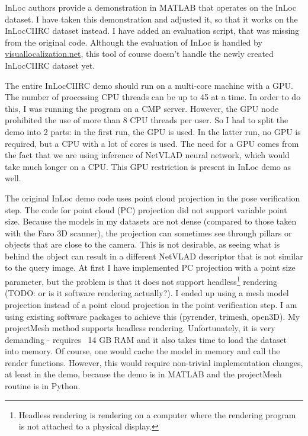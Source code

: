 \documentclass[twoside]{ctuthesis}
\theoremstyle{plain}
\theoremstyle{definition}
\theoremstyle{note}
\begin{document}
InLoc \cite{taira2018inloc} authors provide a demonstration in MATLAB that operates on the InLoc dataset. I have taken this demonstration and adjusted it, so that it works on the InLocCIIRC dataset instead. I have added an evaluation script, that was missing from the original code. Although the evaluation of InLoc is handled by \url{visuallocalization.net}, this tool of course doesn't handle the newly created InLocCIIRC dataset yet.

The entire InLocCIIRC demo should run on a multi-core machine with a GPU. The number of processing CPU threads can be up to 45 at a time. In order to do this, I was running the program on a CMP server. However, the GPU node prohibited the use of more than 8 CPU threads per user. So I had to split the demo into 2 parts: in the first run, the GPU is used. In the latter run, no GPU is required, but a CPU with a lot of cores is used. The need for a GPU comes from the fact that we are using inference of NetVLAD neural network, which would take much longer on a CPU. This GPU restriction is present in InLoc demo as well.

The original InLoc demo code uses point cloud projection in the pose verification step. The code for point cloud (PC) projection did not support variable point size. Because the models in my datasets are not dense (compared to those taken with the Faro 3D scanner), the projection can sometimes see through pillars or objects that are close to the camera. This is not desirable, as seeing what is behind the object can result in a different NetVLAD descriptor that is not similar to the query image. At first I have implemented PC projection with a point size parameter, but the problem is that it does not support headless\footnote{Headless rendering is rendering on a computer where the rendering program is not attached to a physical display.} rendering (TODO: or is it software rendering actually?). I ended up using a mesh model projection instead of a point cloud projection in the point verification step. I am using existing software packages to achieve this (pyrender, trimesh, open3D). My projectMesh method supports headless rendering. Unfortunately, it is very demanding - requires ~14 GB RAM and it also takes time to load the dataset into memory. Of course, one would cache the model in memory and call the render functions. However, this would require non-trivial implementation changes, at least in the demo, because the demo is in MATLAB and the projectMesh routine is in Python.
\end{document}
